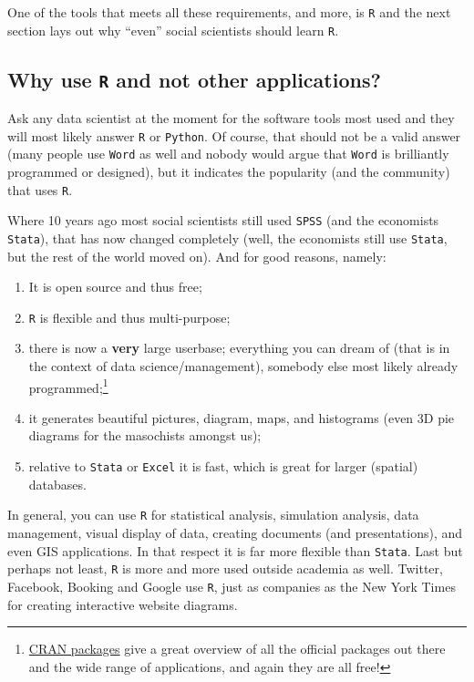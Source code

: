 \documentclass[]{article}
\providecommand{\tightlist}{%
  \setlength{\itemsep}{0pt}\setlength{\parskip}{0pt}}
\let\rmarkdownfootnote\footnote%
\def\footnote{\protect\rmarkdownfootnote}
\theoremstyle{definition}
\theoremstyle{definition}
\theoremstyle{definition}
\theoremstyle{remark}
\begin{document}
One of the tools that meets all these requirements, and more, is
\texttt{R} and the next section lays out why ``even'' social scientists
should learn \texttt{R}.

\subsection{\texorpdfstring{Why use \texttt{R} and not other
applications?}{Why use R and not other applications?}}\label{why-use-r-and-not-other-applications}

Ask any data scientist at the moment for the software tools most used
and they will most likely answer \texttt{R} or \texttt{Python}. Of
course, that should not be a valid answer (many people use \texttt{Word}
as well and nobody would argue that \texttt{Word} is brilliantly
programmed or designed), but it indicates the popularity (and the
community) that uses \texttt{R}.

Where 10 years ago most social scientists still used \texttt{SPSS} (and
the economists \texttt{Stata}), that has now changed completely (well,
the economists still use \texttt{Stata}, but the rest of the world moved
on). And for good reasons, namely:

\begin{enumerate}
\def\labelenumi{\arabic{enumi}.}
\tightlist
\item
  It is open source and thus free;
\item
  \texttt{R} is flexible and thus multi-purpose;
\item
  there is now a \textbf{very} large userbase; everything you can dream
  of (that is in the context of data science/management), somebody else
  most likely already programmed;\footnote{\href{https://cran.r-project.org/web/packages/available_packages_by_name.html}{CRAN
    packages} give a great overview of all the official packages out
    there and the wide range of applications, and again they are all
    free!}
\item
  it generates beautiful pictures, diagram, maps, and histograms (even
  3D pie diagrams for the masochists amongst us);
\item
  relative to \texttt{Stata} or \texttt{Excel} it is fast, which is
  great for larger (spatial) databases.
\end{enumerate}

In general, you can use \texttt{R} for statistical analysis, simulation
analysis, data management, visual display of data, creating documents
(and presentations), and even GIS applications. In that respect it is
far more flexible than \texttt{Stata}. Last but perhaps not least,
\texttt{R} is more and more used outside academia as well. Twitter,
Facebook, Booking and Google use \texttt{R}, just as companies as the
New York Times for creating interactive website diagrams.
\end{document}
